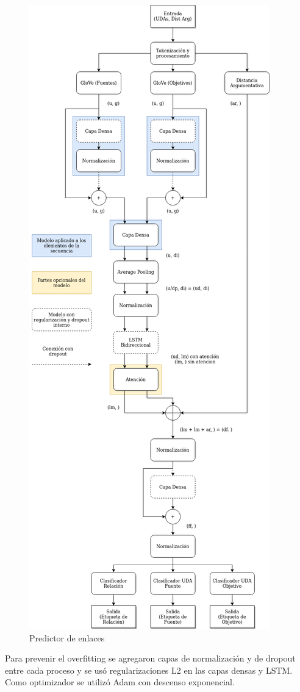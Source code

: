 \begin{figure}[h!]
	\begin{center}
		\begin{center}
			\includegraphics[scale=.3]{Graphics/Modelo_Link_Prediction.png}
        \end{center}
	    \caption{Predictor de enlaces}\label{fig:link_predictor}
	\end{center}
\end{figure}

Para prevenir el overfitting se agregaron capas de normalización y de dropout entre cada proceso y se usó regularizaciones
L2 en las capas densas y LSTM. Como optimizador se utilizó Adam con descenso exponencial.

